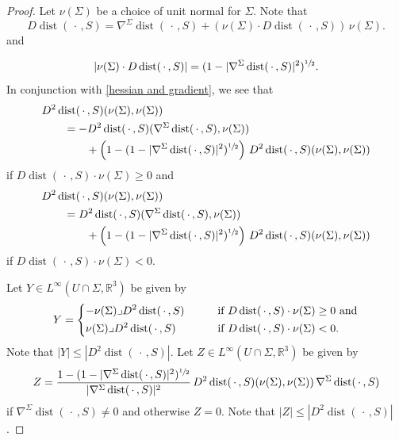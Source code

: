\documentclass[11pt]{amsart}
\begin{document}
\begin{appendices}
\begin{proof}
Let $\nu(\Sigma)$ be a choice of unit normal for $\Sigma$.	Note that
		$$
		D\operatorname{dist}(\,\cdot\,,S)=\nabla^\Sigma \operatorname{dist}(\,\cdot\,,S)+(\nu(\Sigma)\cdot D\operatorname{dist}(\,\cdot\,,S))\,\nu(\Sigma).
		$$ 
		and
	
		$$
		|\nu(\Sigma)\cdot D\operatorname{dist}(\,\cdot\,,S)|=(1-|\nabla^{\Sigma}\operatorname{dist}(\,\cdot\,,S)|^2)^{\sfrac12}.
		$$
		In conjunction with \eqref{hessian and gradient}, we see that 
		\begin{align*} 
		&D^2 \operatorname{dist}(\,\cdot\,,S)(\nu(\Sigma),\nu(\Sigma))\\&\qquad =-D^2 \operatorname{dist}(\,\cdot\,,S)(\nabla^\Sigma \operatorname{dist}(\,\cdot\,,S),\nu(\Sigma))\\&\qquad \qquad +\left(1-(1-|\nabla^{\Sigma}\operatorname{dist}(\,\cdot\,,S)|^2)^{\sfrac12}\right)\,D^2\operatorname{dist}(\,\cdot\,,S)(\nu(\Sigma),\nu(\Sigma))
		\end{align*} 
		if $D\operatorname{dist}(\,\cdot\,,S)\cdot \nu(\Sigma)\geq 0$ and 
			\begin{align*} 
			&D^2 \operatorname{dist}(\,\cdot\,,S)(\nu(\Sigma),\nu(\Sigma))\\&\qquad =D^2 \operatorname{dist}(\,\cdot\,,S)(\nabla^\Sigma \operatorname{dist}(\,\cdot\,,S),\nu(\Sigma))\\&\qquad \qquad +\left(1-(1-|\nabla^{\Sigma}\operatorname{dist}(\,\cdot\,,S)|^2)^{\sfrac12}\right)\,D^2\operatorname{dist}(\,\cdot\,,S)(\nu(\Sigma),\nu(\Sigma))
		\end{align*} 
		if $D\operatorname{dist}(\,\cdot\,,S)\cdot \nu(\Sigma)<0$.
		
		Let $Y\in L^\infty(U\cap \Sigma,\mathbb{R}^3)$   be given by	
		$$
		Y=\begin{dcases}-\nu(\Sigma)\lrcorner D^2 \operatorname{dist}(\,\cdot\,,S)\qquad&\text{if $D\operatorname{dist}(\,\cdot\,,S)\cdot \nu(\Sigma)\geq 0$ and}\\
			\nu(\Sigma)\lrcorner D^2 \operatorname{dist}(\,\cdot\,,S) &\text{if $D\operatorname{dist}(\,\cdot\,,S)\cdot \nu(\Sigma)< 0$}.
		\end{dcases}
		$$
	Note that  $|Y|\leq |D^2 \operatorname{dist}(\,\cdot\,,S)|$. Let $Z\in L^\infty(U\cap \Sigma,\mathbb{R}^3)$ be given by	
		$$
		Z=\frac{1-(1-|\nabla^{\Sigma}\operatorname{dist}(\,\cdot\,,S)|^2)^{\sfrac12}}{|\nabla^\Sigma\operatorname{dist}(\,\cdot\,,S)|^2}\,D^2\operatorname{dist}(\,\cdot\,,S)(\nu(\Sigma),\nu(\Sigma))\,\nabla^\Sigma \operatorname{dist}(\,\cdot\,,S)
		$$
		if $\nabla^\Sigma \operatorname{dist}(\,\cdot\,,S)\neq 0$ and otherwise $Z=0$. 		 Note that  $|Z|\leq |D^2 \operatorname{dist}(\,\cdot\,,S)|$. 
		

\end{proof}
\end{appendices}
\end{document}
